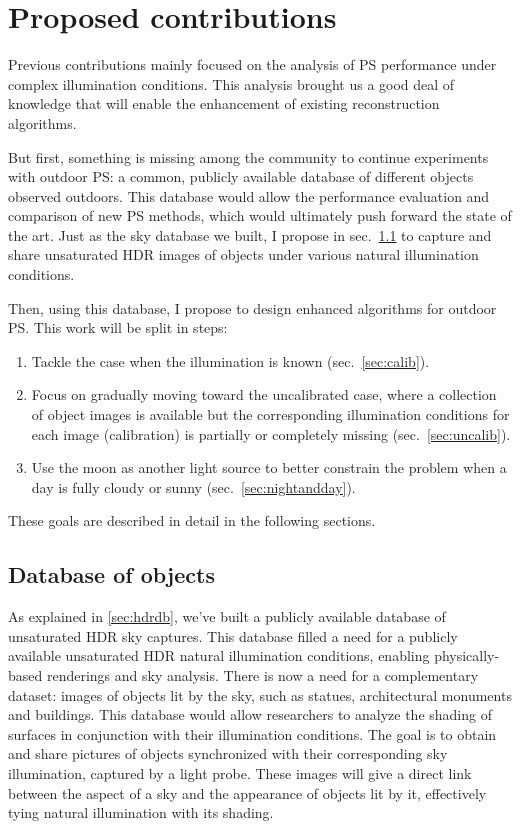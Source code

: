 
\chapter{Proposed contributions}

Previous contributions mainly focused on the analysis of PS performance under complex illumination conditions. This analysis brought us a good deal of knowledge that will enable the enhancement of existing reconstruction algorithms.

But first, something is missing among the community to continue experiments with outdoor PS: a common, publicly available database of different objects observed outdoors. This database would allow the performance evaluation and comparison of new PS methods, which would ultimately push forward the state of the art. Just as the sky database we built, I propose in sec.~\ref{sec:dbobj} to capture and share unsaturated HDR images of objects under various natural illumination conditions.

Then, using this database, I propose to design enhanced algorithms for outdoor PS. This work will be split in steps:
\begin{enumerate}
\item Tackle the case when the illumination is known (sec.~\ref{sec:calib}).
\item Focus on gradually moving toward the uncalibrated case, where a collection of object images is available but the corresponding illumination conditions for each image (calibration) is partially or completely missing (sec.~\ref{sec:uncalib}).
\item Use the moon as another light source to better constrain the problem when a day is fully cloudy or sunny (sec.~\ref{sec:nightandday}).
\end{enumerate}
These goals are described in detail in the following sections.


\section{Database of objects}
\label{sec:dbobj}

As explained in \ref{sec:hdrdb}, we've built a publicly available database of unsaturated HDR sky captures. This database filled a need for a publicly available unsaturated HDR natural illumination conditions, enabling physically-based renderings and sky analysis. There is now a need for a complementary dataset: images of objects lit by the sky, such as statues, architectural monuments and buildings. This database would allow researchers to analyze the shading of surfaces in conjunction with their illumination conditions. The goal is to obtain and share pictures of objects synchronized with their corresponding sky illumination, captured by a light probe. These images will give a direct link between the aspect of a sky and the appearance of objects lit by it, effectively tying natural illumination with its shading.

